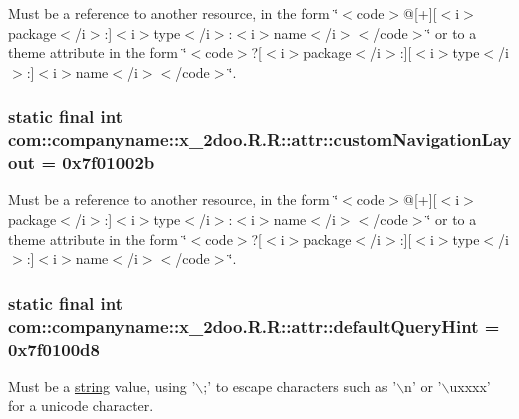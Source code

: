 Must be a reference to another resource, in the form \char`\"{}$<$code$>$@\mbox{[}+\mbox{]}\mbox{[}$<$i$>$package$<$/i$>$:\mbox{]}$<$i$>$type$<$/i$>$:$<$i$>$name$<$/i$>$$<$/code$>$\char`\"{} or to a theme attribute in the form \char`\"{}$<$code$>$?\mbox{[}$<$i$>$package$<$/i$>$:\mbox{]}\mbox{[}$<$i$>$type$<$/i$>$:\mbox{]}$<$i$>$name$<$/i$>$$<$/code$>$\char`\"{}. \hypertarget{classcom_1_1companyname_1_1x__2doo_1_1_r_1_1attr_0140b6fc19536cc50e92405e2ff1636b}{
\subsubsection[{customNavigationLayout}]{\setlength{\rightskip}{0pt plus 5cm}static final int com::companyname::x\_\-2doo.R.R::attr::customNavigationLayout = 0x7f01002b}}
\label{classcom_1_1companyname_1_1x__2doo_1_1_r_1_1attr_0140b6fc19536cc50e92405e2ff1636b}


Must be a reference to another resource, in the form \char`\"{}$<$code$>$@\mbox{[}+\mbox{]}\mbox{[}$<$i$>$package$<$/i$>$:\mbox{]}$<$i$>$type$<$/i$>$:$<$i$>$name$<$/i$>$$<$/code$>$\char`\"{} or to a theme attribute in the form \char`\"{}$<$code$>$?\mbox{[}$<$i$>$package$<$/i$>$:\mbox{]}\mbox{[}$<$i$>$type$<$/i$>$:\mbox{]}$<$i$>$name$<$/i$>$$<$/code$>$\char`\"{}. \hypertarget{classcom_1_1companyname_1_1x__2doo_1_1_r_1_1attr_c53396a95110a93af6091f4b4ad337ad}{
\subsubsection[{defaultQueryHint}]{\setlength{\rightskip}{0pt plus 5cm}static final int com::companyname::x\_\-2doo.R.R::attr::defaultQueryHint = 0x7f0100d8}}
\label{classcom_1_1companyname_1_1x__2doo_1_1_r_1_1attr_c53396a95110a93af6091f4b4ad337ad}


Must be a \hyperlink{classcom_1_1companyname_1_1x__2doo_1_1_r_1_1string}{string} value, using '$\backslash$;' to escape characters such as '$\backslash$n' or '$\backslash$uxxxx' for a unicode character. 

